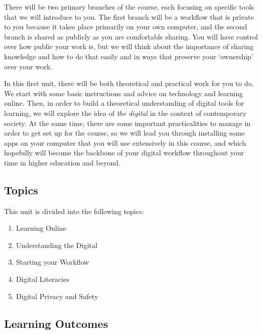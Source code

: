\documentclass[
]{book}
\providecommand{\tightlist}{%
  \setlength{\itemsep}{0pt}\setlength{\parskip}{0pt}}
\theoremstyle{definition}
\theoremstyle{definition}
\theoremstyle{definition}
\theoremstyle{definition}
\theoremstyle{remark}
\begin{document}
There will be two primary branches of the course, each focusing on specific tools that we will introduce to you. The first branch will be a workflow that is private to you because it takes place primarily on your own computer, and the second branch is shared as publicly as you are comfortable sharing. You will have control over how public your work is, but we will think about the importance of sharing knowledge and how to do that easily and in ways that preserve your `ownership' over your work.

In this first unit, there will be both theoretical and practical work for you to do. We start with some basic instructions and advice on technology and learning online. Then, in order to build a theoretical understanding of digital tools for learning, we will explore the idea of \emph{the digital} in the context of contemporary society. At the same time, there are some important practicalities to manage in order to get set up for the course, so we will lead you through installing some apps on your computer that you will use extensively in this course, and which hopefully will become the backbone of your digital workflow throughout your time in higher education and beyond.

\hypertarget{topics}{%
\subsection*{Topics}\label{topics}}

This unit is divided into the following topics:

\begin{enumerate}
\def\labelenumi{\arabic{enumi}.}
\tightlist
\item
  Learning Online
\item
  Understanding the Digital\\
\item
  Starting your Workflow\\
\item
  Digital Literacies\\
\item
  Digital Privacy and Safety
\end{enumerate}

\hypertarget{learning-outcomes}{%
\subsection*{Learning Outcomes}\label{learning-outcomes}}
\end{document}
